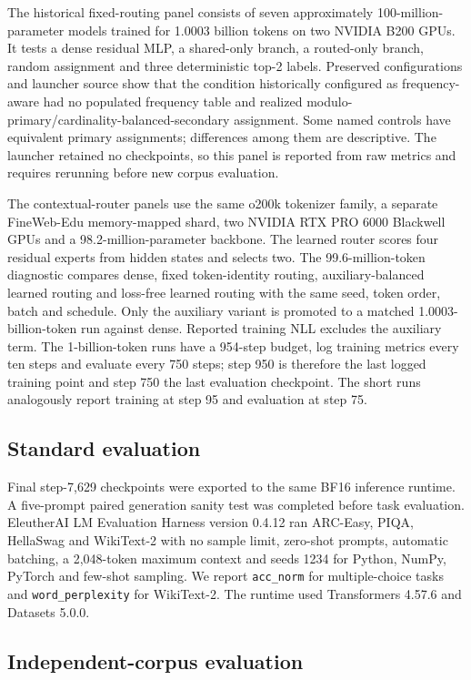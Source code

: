 \documentclass[11pt]{article}
\begin{document}
The historical fixed-routing panel consists of seven approximately 100-million-parameter models trained for 1.0003 billion tokens on two NVIDIA B200 GPUs. It tests a dense residual MLP, a shared-only branch, a routed-only branch, random assignment and three deterministic top-2 labels. Preserved configurations and launcher source show that the condition historically configured as frequency-aware had no populated frequency table and realized modulo-primary/cardinality-balanced-secondary assignment. Some named controls have equivalent primary assignments; differences among them are descriptive. The launcher retained no checkpoints, so this panel is reported from raw metrics and requires rerunning before new corpus evaluation.

The contextual-router panels use the same o200k tokenizer family, a separate FineWeb-Edu memory-mapped shard, two NVIDIA RTX PRO 6000 Blackwell GPUs and a 98.2-million-parameter backbone. The learned router scores four residual experts from hidden states and selects two. The 99.6-million-token diagnostic compares dense, fixed token-identity routing, auxiliary-balanced learned routing and loss-free learned routing with the same seed, token order, batch and schedule. Only the auxiliary variant is promoted to a matched 1.0003-billion-token run against dense. Reported training NLL excludes the auxiliary term. The 1-billion-token runs have a 954-step budget, log training metrics every ten steps and evaluate every 750 steps; step 950 is therefore the last logged training point and step 750 the last evaluation checkpoint. The short runs analogously report training at step 95 and evaluation at step 75.

\subsection*{Standard evaluation}

Final step-7,629 checkpoints were exported to the same BF16 inference runtime. A five-prompt paired generation sanity test was completed before task evaluation. EleutherAI LM Evaluation Harness version 0.4.12 ran ARC-Easy, PIQA, HellaSwag and WikiText-2 with no sample limit, zero-shot prompts, automatic batching, a 2,048-token maximum context and seeds 1234 for Python, NumPy, PyTorch and few-shot sampling. We report \texttt{acc\_norm} for multiple-choice tasks and \texttt{word\_perplexity} for WikiText-2. The runtime used Transformers 4.57.6 and Datasets 5.0.0.

\subsection*{Independent-corpus evaluation}
\end{document}
